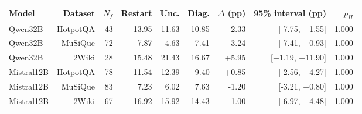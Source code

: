 \begin{tabular}{@{}lrrrrrrrr@{}}
\toprule
Model & Dataset & $N_f$ & Restart & Unc. & Diag. & $\Delta$ (pp) & 95\% interval (pp) & $p_H$ \\
\midrule
Qwen32B & HotpotQA & 43 & 13.95 & 11.63 & 10.85 & -2.33 & [-7.75, +1.55] & 1.000 \\
Qwen32B & MuSiQue & 72 & 7.87 & 4.63 & 7.41 & -3.24 & [-7.41, +0.93] & 1.000 \\
Qwen32B & 2Wiki & 28 & 15.48 & 21.43 & 16.67 & +5.95 & [+1.19, +11.90] & 1.000 \\
Mistral12B & HotpotQA & 78 & 11.54 & 12.39 & 9.40 & +0.85 & [-2.56, +4.27] & 1.000 \\
Mistral12B & MuSiQue & 83 & 7.23 & 6.02 & 7.63 & -1.20 & [-3.21, +0.80] & 1.000 \\
Mistral12B & 2Wiki & 67 & 16.92 & 15.92 & 14.43 & -1.00 & [-6.97, +4.48] & 1.000 \\
\bottomrule
\end{tabular}
